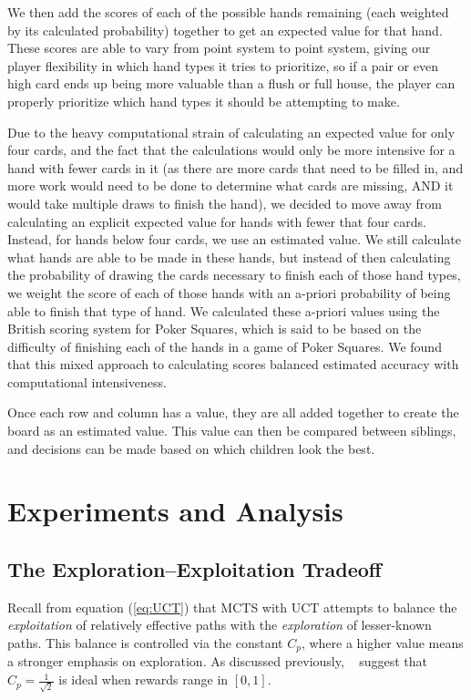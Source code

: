\documentclass[letterpaper]{article}
\begin{document}
We then add the scores of each of the possible hands remaining (each weighted by its calculated probability) together to get an expected value for that hand. These scores are able to vary from point system to point system, giving our player flexibility in which hand types it tries to prioritize, so if a pair or even high card ends up being more valuable than a flush or full house, the player can properly prioritize which hand types it should be attempting to make.

Due to the heavy computational strain of calculating an expected value for only four cards, and the fact that the calculations would only be more intensive for a hand with fewer cards in it (as there are more cards that need to be filled in, and more work would need to be done to determine what cards are missing, AND it would take multiple draws to finish the hand), we decided to move away from calculating an explicit expected value for hands with fewer that four cards. Instead, for hands below four cards, we use an estimated value. We still calculate what hands are able to be made in these hands, but instead of then calculating the probability of drawing the cards necessary to finish each of those hand types, we weight the score of each of those hands with an a-priori probability of being able to finish that type of hand. We calculated these a-priori values using the British scoring system for Poker Squares, which is said to be based on the difficulty of finishing each of the hands in a game of Poker Squares. We found that this mixed approach to calculating scores balanced estimated accuracy with computational intensiveness.

Once each row and column has a value, they are all added together to create the board as an estimated value. This value can then be compared between siblings, and decisions can be made based on which children look the best. 

\section{Experiments and Analysis}

\subsection{The Exploration--Exploitation Tradeoff}
Recall from equation (\ref{eq:UCT}) that MCTS with UCT attempts to balance the {\it exploitation} of relatively effective paths with the {\it exploration} of lesser-known paths. This balance is controlled via the constant $C_p$, where a higher value means a stronger emphasis on exploration. As discussed previously, ~\cite{kocsis2006improved} suggest that $C_p = \frac{1}{\sqrt{2}}$ is ideal when rewards range in $[0,1]$. 
\end{document}
